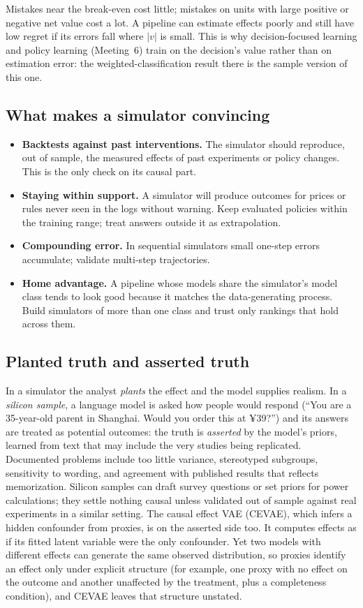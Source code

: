 \documentclass[11pt]{article}
\begin{document}
Mistakes near the break-even cost little; mistakes on units with large positive or negative net value cost a lot. A pipeline can
estimate effects poorly and still have low regret if its errors fall where $|v|$ is small. This is why decision-focused learning and policy learning (Meeting~6) train on the decision's value
rather than on estimation error: the weighted-classification result there is the sample version of this one.

\subsection{What makes a simulator convincing}

\begin{itemize}
  \item \textbf{Backtests against past interventions.} The simulator should reproduce, out of sample, the measured effects of past
  experiments or policy changes. This is the only check on its causal part.
  \item \textbf{Staying within support.} A simulator will produce outcomes for prices or rules never seen in the logs without warning.
  Keep evaluated policies within the training range; treat answers outside it as extrapolation.
  \item \textbf{Compounding error.} In sequential simulators small one-step errors accumulate; validate multi-step trajectories.
  \item \textbf{Home advantage.} A pipeline whose models share the simulator's model class tends to look good because it matches the
  data-generating process. Build simulators of more than one class and trust only rankings that hold across them.
\end{itemize}

\subsection{Planted truth and asserted truth}

In a simulator the analyst \emph{plants} the effect and the model supplies realism. In a \emph{silicon sample}, a language model is asked
how people would respond (``You are a 35-year-old parent in Shanghai. Would you order this at ¥39?'') and its answers are treated as
potential outcomes: the truth is \emph{asserted} by the model's priors, learned from text that may include the very studies being
replicated. Documented problems include too little variance, stereotyped subgroups, sensitivity to wording, and agreement with
published results that reflects memorization. Silicon samples can draft survey questions or set priors for power calculations; they
settle nothing causal unless validated out of sample against real experiments in a similar setting. The causal effect VAE (CEVAE),
which infers a hidden confounder from proxies, is on the asserted side too. It computes effects as if its fitted latent variable were
the only confounder. Yet two models with different effects can generate the same observed distribution, so proxies identify an effect
only under explicit structure (for example, one proxy with no effect on the outcome and another unaffected by the treatment, plus a
completeness condition), and CEVAE leaves that structure unstated.
\end{document}
